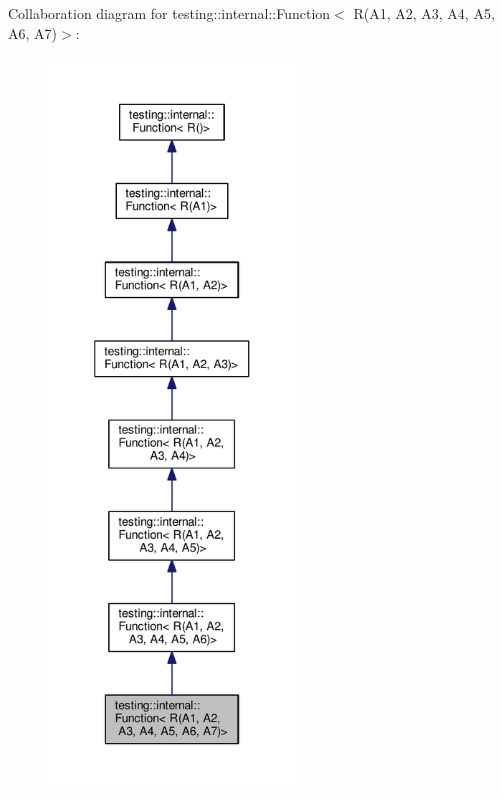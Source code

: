 Collaboration diagram for testing\+:\+:internal\+:\+:Function$<$ R(A1, A2, A3, A4, A5, A6, A7)$>$\+:
\nopagebreak
\begin{figure}[H]
\begin{center}
\leavevmode
\includegraphics[height=550pt]{structtesting_1_1internal_1_1Function_3_01R_07A1_00_01A2_00_01A3_00_01A4_00_01A5_00_01A6_00_01A7_08_4__coll__graph}
\end{center}
\end{figure}
